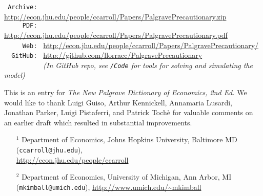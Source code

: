 \documentclass[12pt,letterpaper]{econtex}
\begin{document}
\begin{titlepage}
  \begin{small}
    \parbox{\textwidth}{
      \begin{center}
        \begin{tabbing}
          \texttt{~Archive:~} \= \= \url{http://econ.jhu.edu/people/ccarroll/Papers/PalgravePrecautionary.zip} \\
          \texttt{~~~~~PDF:~} \> \> \url{http://econ.jhu.edu/people/ccarroll/Papers/PalgravePrecautionary.pdf} \\
          \texttt{~~~~~Web:~} \> \>  \url{http://econ.jhu.edu/people/ccarroll/Papers/PalgravePrecautionary/}\\
          \texttt{~~GitHub:~} \> \> \url{http://github.com/llorracc/PalgravePrecautionary} \\
          \texttt{~~~~~~~~~~} \> \> \textit{(In GitHub repo, see \texttt{/Code} for tools for solving and simulating the model)} \\
        \end{tabbing}
      \end{center}
    }


  

  \noindent This is an entry for {\it The New Palgrave Dictionary of Economics, 2nd Ed.}  We would like to thank Luigi Guiso, Arthur Kennickell, Annamaria Lusardi, Jonathan Parker, Luigi Pistaferri,
  and Patrick Toch\`e for valuable comments on an earlier draft which resulted in substantial improvements.


  \begin{itemize}
  \item[$^1$] Department of Economics, Johns Hopkins University, Baltimore MD (\texttt{ccarroll@jhu.edu}),
    \\ \url{http://econ.jhu.edu/people/ccarroll}

  \item[$^2$] Department of Economics, University of Michigan, Ann Arbor, MI (\texttt{mkimball@umich.edu}), \url{http://www.umich.edu/~mkimball}
  \end{itemize}

  \end{small}          

\end{titlepage}


\setlength{\footskip}{36pt}

\pagestyle{plain}\thispagestyle{empty}

\titlepage

\tableofcontents
\end{document}
